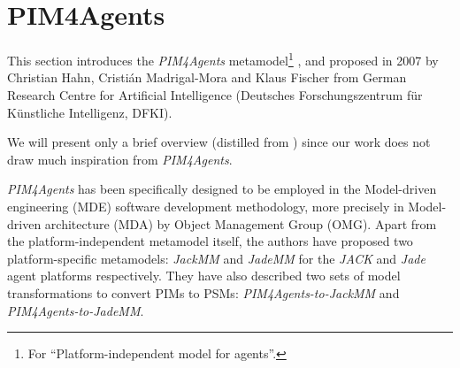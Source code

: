 
\section{PIM4Agents}

This section introduces the \textit{PIM4Agents} metamodel\footnote{For ``Platform-independent model for agents''.} \cite{Hahn07a}, \cite{Hahn07b} and \cite{Hahn08} proposed in 2007 by Christian Hahn, Cristián Madrigal-Mora and Klaus Fischer from German Research Centre for Artificial Intelligence (Deutsches Forschungszentrum f\"{u}r K\"{u}nstliche Intelligenz, DFKI).

We will present only a brief overview (distilled from \cite{Hahn07b}) since our work does not draw much inspiration from \textit{PIM4Agents}.


\textit{PIM4Agents} has been specifically designed to be employed in the Model-driven engineering (MDE) software development methodology, more precisely in Model-driven architecture (MDA) by Object Management Group (OMG).
Apart from the platform-independent metamodel itself, the authors have proposed two platform-specific metamodels: \textit{JackMM} and \textit{JadeMM} for the \textit{JACK} and \textit{Jade} agent platforms respectively.
They have also described two sets of model transformations to convert PIMs to PSMs: \textit{PIM4Agents-to-JackMM} and \textit{PIM4Agents-to-JadeMM}.

